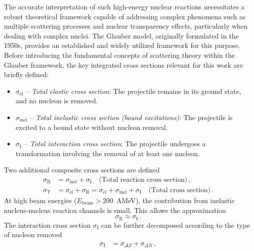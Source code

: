 The accurate interpretation of such high-energy nuclear reactions necessitates a robust theoretical framework capable of addressing complex phenomena such as multiple scattering processes and nuclear transparency effects, particularly when dealing with complex nuclei. The Glauber model, originally formulated in the 1950s, provides an established and widely utilized framework for this purpose.\\
Before introducing the fundamental concepts of scattering theory within the Glauber framework, the key integrated cross sections relevant for this work are briefly defined:
\begin{itemize}
    \item \boldmath$\sigma_{\mathrm{el}}$\unboldmath{} -- \textit{Total elastic cross section}: The projectile remains in its ground state, and no nucleon is removed.
    
    \item \boldmath$\sigma_{\mathrm{inel}}$\unboldmath{} -- \textit{Total inelastic cross section (bound excitations)}: The projectile is excited to a bound state without nucleon removal.
    
    \item \boldmath$\sigma_{\mathrm{I}}$\unboldmath{} -- \textit{Total interaction cross section}: The projectile undergoes a transformation involving the removal of at least one nucleon.
\end{itemize}
Two additional composite cross sections are defined
\begin{align}
    \sigma_{\mathrm{R}} &= \sigma_{\mathrm{inel}} + \sigma_{\mathrm{I}} \quad \text{(Total reaction cross section)} \, , \\
    \sigma_{\mathrm{T}} &= \sigma_{\mathrm{el}} + \sigma_{\mathrm{R}} = \sigma_{\mathrm{el}} + \sigma_{\mathrm{inel}} + \sigma_{\mathrm{I}} \quad \text{(Total cross section)} \, . \label{eq:tot_cs_def}
\end{align}
At high beam energies ($E_{\mathrm{beam}} > 200$~AMeV), the contribution from inelastic nucleus-nucleus reaction channels is small. This allows the approximation
\begin{equation}
    \sigma_{\mathrm{R}} \approx \sigma_{\mathrm{I}} \, .
\end{equation}
The interaction cross section $\sigma_{\mathrm{I}}$ can be further decomposed according to the type of nucleon removed
\begin{align}
    \sigma_{\mathrm{I}} &= \sigma_{\Delta Z} + \sigma_{\Delta N} \, , 
\end{align}
